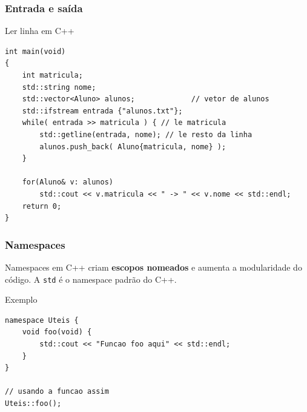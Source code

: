 \documentclass[xcolor={usenames,dvipsnames},10pt,compress,aspectratio=169]{beamer}
\begin{document}
\begin{frame}[fragile]
  \frametitle{Entrada e saída}
  \begin{block}{Ler linha em C++}
\begin{lstlisting}
int main(void)
{
    int matricula;
    std::string nome;
    std::vector<Aluno> alunos;             // vetor de alunos
    std::ifstream entrada {"alunos.txt"};
    while( entrada >> matricula ) { // le matricula 
        std::getline(entrada, nome); // le resto da linha
        alunos.push_back( Aluno{matricula, nome} );
    }

    for(Aluno& v: alunos)
        std::cout << v.matricula << " -> " << v.nome << std::endl;
    return 0;
}
\end{lstlisting}
  \end{block}
\end{frame}
\begin{frame}[fragile]
  \frametitle{Namespaces}
Namespaces em C++ criam \textbf{escopos nomeados}  e aumenta a modularidade do código.
A \verb+std+ é o namespace padrão do C++.
  \begin{block}{Exemplo}
\begin{lstlisting}
namespace Uteis {
    void foo(void) {
        std::cout << "Funcao foo aqui" << std::endl;
    }
}

// usando a funcao assim
Uteis::foo();
\end{lstlisting}
  \end{block}
\end{frame}
\end{document}
